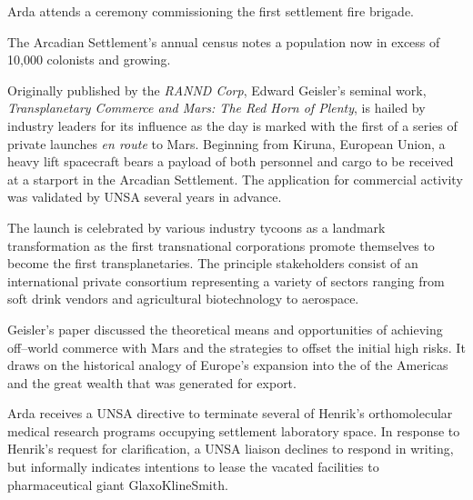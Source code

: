 

Arda attends a ceremony commissioning the first settlement fire brigade.
\StopTimelineDate

The Arcadian Settlement's annual census notes a population now in excess of 10,000 colonists and growing.
\StopTimelineDate

Originally published by the {\it RANND Corp}, Edward Geisler's seminal work, {\it Transplanetary Commerce and Mars: The Red Horn of Plenty}, is hailed by industry leaders for its influence as the day is marked with the first of a series of private launches {\it en route} to Mars. Beginning from Kiruna, European Union, a heavy lift spacecraft bears a payload of both personnel and cargo to be received at a starport in the Arcadian Settlement. The application for commercial activity was validated by UNSA several years in advance.

The launch is celebrated by various industry tycoons as a landmark transformation as the first transnational corporations promote themselves to become the first transplanetaries. The principle stakeholders consist of an international private consortium representing a variety of sectors ranging from soft drink vendors and agricultural biotechnology to aerospace.

Geisler's paper discussed the theoretical means and opportunities of achieving off--world commerce with Mars and the strategies to offset the initial high risks. It draws on the historical analogy of Europe's expansion into the  of the Americas and the great wealth that was generated for export.
\StopTimelineDate

Arda receives a UNSA directive to terminate several of Henrik's orthomolecular medical research programs occupying settlement laboratory space. In response to Henrik's request for clarification, a UNSA liaison declines to respond in writing, but informally indicates intentions to lease the vacated facilities to pharmaceutical giant GlaxoKlineSmith.
\StopTimelineDate

